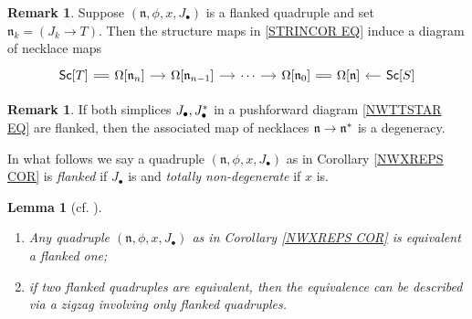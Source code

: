 \documentclass[a4paper,10pt]{article}%
\numberwithin{equation}{section}
\numberwithin{figure}{section}
\newtheorem{lemma}[equation]{Lemma}%
\theoremstyle{definition} %
\newtheorem{remark}[equation]{Remark}%
\newcommand{\1}{\ensuremath{\mathbbm 1}}%
\begin{document}
\begin{remark}
	Suppose $(\mathfrak{n},\phi,x,J_{\bullet})$
	is a flanked quadruple
	and set $\mathfrak{n}_k = (J_k \to T)$.
	Then the structure maps in \eqref{STRINCOR EQ}
	induce a diagram of necklace maps
\begin{equation}
\begin{tikzcd}[column sep=12pt]
	\mathsf{Sc}[T]
	\ar[equal]{r} 
&
	\Omega[\mathfrak{n}_n]
	\ar{r}
&
	\Omega[\mathfrak{n}_{n-1}]
	\ar{r}
&
	\cdots
	\ar{r}
&
	\Omega[\mathfrak{n}_0]
	\ar[equal]{r}
&
	\Omega[\mathfrak{n}]
&
	\mathsf{Sc}[S]
	\ar{l}
\end{tikzcd}
\end{equation} 
\end{remark}



\begin{remark}\label{FLNKNECDEG REM}
	If both simplices 
	$J_{\bullet},J^{\**}_{\bullet}$ in a pushforward diagram
	\eqref{NWTTSTAR EQ}
	are flanked,
	then the associated map of necklaces
	$\mathfrak{n} \to \mathfrak{n}^{\**}$
	is a degeneracy.
\end{remark}


In what follows we say a quadruple
$(\mathfrak{n},\phi,x,J_{\bullet})$
as in Corollary \ref{NWXREPS COR}
is \emph{flanked} if $J_{\bullet}$ is and
\emph{totally non-degenerate} if $x$ is.


\begin{lemma}[{cf. \cite[Lemma 4.5]{DS11}}]
	\label{FLANKING LEM}
	\begin{enumerate}[label=(\roman*)]
		\item Any quadruple $(\mathfrak{n},\phi,x,J_{\bullet})$
		as in Corollary \ref{NWXREPS COR} is equivalent a flanked one;
		\item if two flanked quadruples are equivalent, then the equivalence can be described via a zigzag involving only flanked quadruples.
	\end{enumerate}
\end{lemma}
\end{document}
